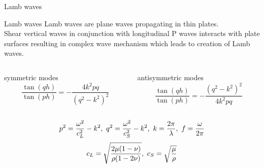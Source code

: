 \documentclass[10pt,aspectratio=169,dvipsnames]{beamer} %
\begin{document}
	\begin{frame}{Lamb waves}
		\begin{alertblock}{Lamb waves}	
			Lamb waves are plane waves propagating in thin plates.\\
			Shear vertical waves in conjunction with longitudinal P waves interacts with plate surfaces resulting in complex wave mechanism which leads to creation of Lamb waves.
		\end{alertblock}
		\begin{columns}[T]
			\begin{column}{0.5\textwidth}
				\centering
				symmetric modes
				\begin{equation*}
					\frac{\tan(q h)}{\tan(p h)} = -\frac{4 k^2 p q}{\left(q^2 - k^2\right)^2}
				\end{equation*}
			\end{column}
			\begin{column}{0.5\textwidth}
				\centering
				antisymmetric modes
				\begin{equation*}
					\frac{\tan(q h)}{\tan(p h)} = -\frac{\left(q^2 - k^2\right)^2}{4 k^2 p q}
				\end{equation*}
			\end{column}	
		\end{columns}	
		\centering
		\begin{gather*}
			\centering
			p^2 = \frac{\omega^2}{c_{L}^2}-k^2,\ q^2 = \frac{\omega^2}{c_{S}^2}-k^2,\ k = \frac{2\pi}{\lambda},\ f=\frac{\omega}{2\pi}
		\end{gather*}
		\newline
		\begin{gather*}
			\centering
			c_L=\sqrt{\frac{2\mu (1-\nu)}{\rho(1-2\nu)}},\ c_S=\sqrt{\frac{\mu}{\rho}}
		\end{gather*}
	\end{frame}
\end{document}
